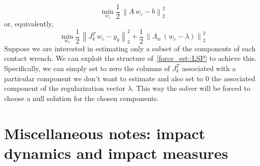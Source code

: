 \documentclass[letterpaper, 10 pt, conference]{ieeeconf}  %
\begin{document}
\begin{equation*}
\min_{w_c} \frac{1}{2}\,\left\| A\,w_c-b \right\|_2^2
\end{equation*}
or, equivalently, 
\begin{dmath*}
\min_{w_c} \frac{1}{2}\,\left\| J_k^T\,w_c-y_k \right\|_2^2 + \frac{1}{2}\,\left\| \Lambda_w\,\left(w_c-\lambda\right)  \right\|_2^2
\end{dmath*}
Suppose we are interested in estimating only a subset of the components of each contact wrench. We can exploit the structure of~\eqref{force_est::LSP} to achieve this. Specifically, we can simply set to zero the columns of $J^T_k$ associated with a particular component we don't want to estimate and also set to 0 the associated component of the regularization vector $\lambda$. This way the solver will be forced to choose a null solution for the chosen components.
\clearpage

\section{Miscellaneous notes: impact dynamics and impact measures}\label{section::impact_dynamics}
\end{document}

